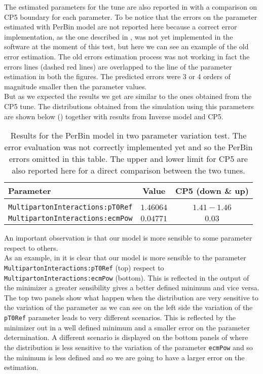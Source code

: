 \noindent The estimated parameters for the tune are also reported in  with a comparison on CP5 boundary for each parameter. To be notice that the errors on the parameter estimated with PerBin model are not reported here because a correct error implementation, as the one described in , was not yet implemented in the software at the moment of this test, but here we can see an example of the old error estimation. The old errors estimation process was not working in fact the errors lines (dashed red lines) are overlapped to the line of the parameter estimation in both the figures. The predicted errors were 3 or 4 orders of magnitude smaller then the parameter values. 
\\
But as we expected the results we get are similar to the ones obtained from the CP5 tune. The distributions obtained from the simulation using this parameters are shown below () together with results from Inverse model and CP5.

\begin{table}[!htb]
\centering
	\begin{tabular}{l | c | c}
		Parameter & Value & CP5 (down \& up) \\ \hline\hline
		\\[-0.85em]		
		\texttt{MultipartonInteractions:pT0Ref} & $ 1.46064$ & $1.41-1.46$\\
		\texttt{MultipartonInteractions:ecmPow} & $ 0.04771$ & $0.03$\\
	\end{tabular}
	\caption{Results for the PerBin model in two parameter variation test. The error evaluation was not correctly implemented yet and so the PerBin errors omitted in this table. The upper and lower limit for CP5 are also reported here for a direct comparison between the two tunes.}
	\label{table:resultPerBin_2param}
\end{table}

\medskip

An important observation is that our model is more sensible to some parameter respect to others.
\\
As an example, in  it is clear that our model is more sensible to the parameter \texttt{MultipartonInteractions:pT0Ref} (top) respect to 
\texttt{MultipartonInteractions:}\-\texttt{ecmPow} (bottom). This is reflected in the output of the minimizer a greater sensibility gives a better defined minimum and vice versa. The top two panels show what happen when the distribution are very sensitive to the variation of the parameter as we can see on the left side the variation of the \texttt{pT0Ref} parameter leads to very different scenarios. This is reflected by the minimizer out in a well defined minimum and a smaller error on the parameter determination. A different scenario is displayed on the bottom panels of  where the distribution is less sensitive to the variation of the parameter \texttt{ecmPow} and so the minimum is less defined and so we are going to have a larger error on the estimation.

